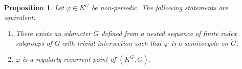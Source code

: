 \documentclass[titlepage,reqno,10pt]{amsart}
\newtheorem{proposition}[theorem]{Proposition}
\theoremstyle{definition}
\begin{document}
\begin{proposition}\label{semicocycles}
Let $\varphi\in K^G$ be non-periodic. The following statements are equivalent:
\begin{enumerate}   
  \item  There exists an odometer $\overleftarrow{G}$ defined from a nested sequence of finite index subgroups of $G$ with trivial intersection  such that $\varphi$ is a semicocycle on $\overleftarrow{G}$.
  \item $\varphi$ is a regularly recurrent point of $(K^G,G)$.
  \end{enumerate}
\end{proposition}
\end{document}
